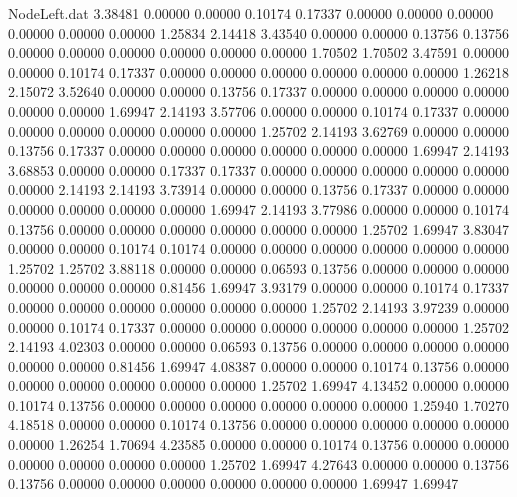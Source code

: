 \begin{filecontents}{NodeLeft.dat}
   3.38481    0.00000    0.00000     0.10174    0.17337    0.00000    0.00000    0.00000    0.00000    0.00000    0.00000    1.25834    2.14418
   3.43540    0.00000    0.00000     0.13756    0.13756    0.00000    0.00000    0.00000    0.00000    0.00000    0.00000    1.70502    1.70502
   3.47591    0.00000    0.00000     0.10174    0.17337    0.00000    0.00000    0.00000    0.00000    0.00000    0.00000    1.26218    2.15072
   3.52640    0.00000    0.00000     0.13756    0.17337    0.00000    0.00000    0.00000    0.00000    0.00000    0.00000    1.69947    2.14193
   3.57706    0.00000    0.00000     0.10174    0.17337    0.00000    0.00000    0.00000    0.00000    0.00000    0.00000    1.25702    2.14193
   3.62769    0.00000    0.00000     0.13756    0.17337    0.00000    0.00000    0.00000    0.00000    0.00000    0.00000    1.69947    2.14193
   3.68853    0.00000    0.00000     0.17337    0.17337    0.00000    0.00000    0.00000    0.00000    0.00000    0.00000    2.14193    2.14193
   3.73914    0.00000    0.00000     0.13756    0.17337    0.00000    0.00000    0.00000    0.00000    0.00000    0.00000    1.69947    2.14193
   3.77986    0.00000    0.00000     0.10174    0.13756    0.00000    0.00000    0.00000    0.00000    0.00000    0.00000    1.25702    1.69947
   3.83047    0.00000    0.00000     0.10174    0.10174    0.00000    0.00000    0.00000    0.00000    0.00000    0.00000    1.25702    1.25702
   3.88118    0.00000    0.00000     0.06593    0.13756    0.00000    0.00000    0.00000    0.00000    0.00000    0.00000    0.81456    1.69947
   3.93179    0.00000    0.00000     0.10174    0.17337    0.00000    0.00000    0.00000    0.00000    0.00000    0.00000    1.25702    2.14193
   3.97239    0.00000    0.00000     0.10174    0.17337    0.00000    0.00000    0.00000    0.00000    0.00000    0.00000    1.25702    2.14193
   4.02303    0.00000    0.00000     0.06593    0.13756    0.00000    0.00000    0.00000    0.00000    0.00000    0.00000    0.81456    1.69947
   4.08387    0.00000    0.00000     0.10174    0.13756    0.00000    0.00000    0.00000    0.00000    0.00000    0.00000    1.25702    1.69947
   4.13452    0.00000    0.00000     0.10174    0.13756    0.00000    0.00000    0.00000    0.00000    0.00000    0.00000    1.25940    1.70270
   4.18518    0.00000    0.00000     0.10174    0.13756    0.00000    0.00000    0.00000    0.00000    0.00000    0.00000    1.26254    1.70694
   4.23585    0.00000    0.00000     0.10174    0.13756    0.00000    0.00000    0.00000    0.00000    0.00000    0.00000    1.25702    1.69947
   4.27643    0.00000    0.00000     0.13756    0.13756    0.00000    0.00000    0.00000    0.00000    0.00000    0.00000    1.69947    1.69947

\end{filecontents}
